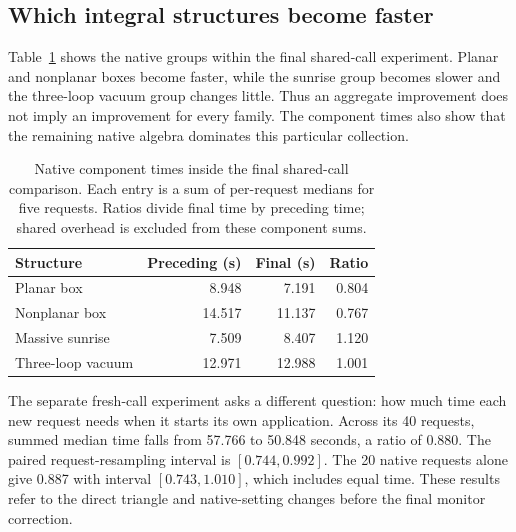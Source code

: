 \subsection{Which integral structures become faster}
Table~\ref{tab:group-times} shows the native groups within the final shared-call experiment. Planar and nonplanar boxes become faster, while the sunrise group becomes slower and the three-loop vacuum group changes little. Thus an aggregate improvement does not imply an improvement for every family. The component times also show that the remaining native algebra dominates this particular collection.

\begin{table}[!htbp]\centering\small
\caption{Native component times inside the final shared-call comparison. Each entry is a sum of per-request medians for five requests. Ratios divide final time by preceding time; shared overhead is excluded from these component sums.}
\label{tab:group-times}
\begin{tabular}{@{}lrrr@{}}\toprule
Structure & Preceding (s) & Final (s) & Ratio\\\midrule
Planar box & 8.948 & 7.191 & 0.804\\
Nonplanar box & 14.517 & 11.137 & 0.767\\
Massive sunrise & 7.509 & 8.407 & 1.120\\
Three-loop vacuum & 12.971 & 12.988 & 1.001\\\bottomrule
\end{tabular}
\end{table}
The separate fresh-call experiment asks a different question: how much time each new request needs when it starts its own application. Across its 40 requests, summed median time falls from 57.766 to 50.848 seconds, a ratio of 0.880. The paired request-resampling interval is $[0.744,0.992]$. The 20 native requests alone give 0.887 with interval $[0.743,1.010]$, which includes equal time. These results refer to the direct triangle and native-setting changes before the final monitor correction.

